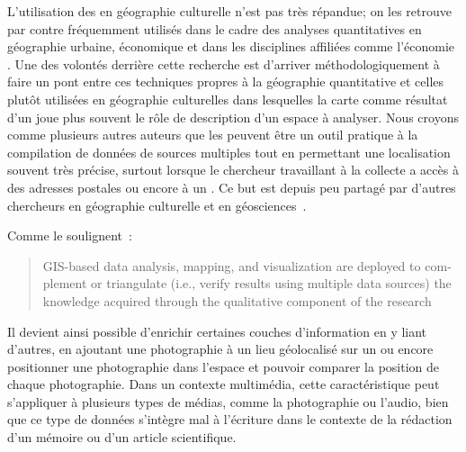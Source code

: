 L'utilisation des \sig{} en géographie culturelle n'est pas très répandue; on les retrouve par contre fréquemment utilisés dans le cadre des analyses quantitatives en géographie urbaine, économique et dans les disciplines affiliées comme l'économie \missref{}.
Une des volontés derrière cette recherche est d'arriver méthodologiquement à faire un pont entre ces techniques propres à la géographie quantitative et celles plutôt utilisées en géographie culturelles dans lesquelles la carte comme résultat d'un \sig{} joue plus souvent le rôle de description d'un espace à analyser.
Nous croyons comme plusieurs autres auteurs \citep[4]{Elwood2009} que les \sig{} peuvent être un outil pratique à la compilation de données de sources multiples tout en permettant une localisation souvent très précise, surtout lorsque le chercheur travaillant à la collecte a accès à des adresses postales ou encore à un \gps.
Ce but est depuis peu partagé par d'autres chercheurs en géographie culturelle et en géosciences~\citep{Perkins2003,Elwood2011,Elwood2009,Kwan2008,Madden2009,Knigge2006,Jung2010}.

Comme le soulignent~\cite{Kwan2008}: \foreignblockquote{english}[{\citeyear[444]{Kwan2008}}][]{GIS-based data analysis, mapping, and visualization are deployed to complement or triangulate (i.e., verify results using multiple data sources) the knowledge acquired through the qualitative component of the research}.
Il devient ainsi possible d'enrichir certaines couches d'information en y liant d'autres, en ajoutant une photographie à un lieu géolocalisé sur un \sig{} ou encore positionner une photographie dans l'espace et pouvoir comparer la position de chaque photographie.
Dans un contexte multimédia, cette caractéristique peut s'appliquer à plusieurs types de médias, comme la photographie ou l'audio, bien que ce type de données s'intègre mal à l'écriture dans le contexte de la rédaction d'un mémoire ou d'un article scientifique.

